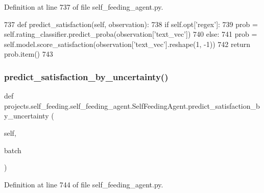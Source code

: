 Definition at line 737 of file self\+\_\+feeding\+\_\+agent.\+py.


\begin{DoxyCode}
737     \textcolor{keyword}{def }predict\_satisfaction(self, observation):
738         \textcolor{keywordflow}{if} self.opt[\textcolor{stringliteral}{'regex'}]:
739             prob = self.rating\_classifier.predict\_proba(observation[\textcolor{stringliteral}{'text\_vec'}])
740         \textcolor{keywordflow}{else}:
741             prob = self.model.score\_satisfaction(observation[\textcolor{stringliteral}{'text\_vec'}].reshape(1, -1))
742         \textcolor{keywordflow}{return} prob.item()
743 
\end{DoxyCode}
\mbox{\label{classprojects_1_1self__feeding_1_1self__feeding__agent_1_1SelfFeedingAgent_a2788bb764560c9d021ac0b8a5596e1e0}} 
\subsubsection{\texorpdfstring{predict\+\_\+satisfaction\+\_\+by\+\_\+uncertainty()}{predict\_satisfaction\_by\_uncertainty()}}
{\footnotesize\ttfamily def projects.\+self\+\_\+feeding.\+self\+\_\+feeding\+\_\+agent.\+Self\+Feeding\+Agent.\+predict\+\_\+satisfaction\+\_\+by\+\_\+uncertainty (\begin{DoxyParamCaption}\item[{}]{self,  }\item[{}]{batch }\end{DoxyParamCaption})}



Definition at line 744 of file self\+\_\+feeding\+\_\+agent.\+py.


